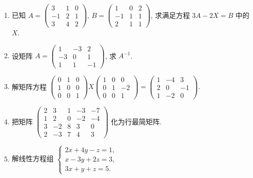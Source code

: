 \begin{enumerate}
	
	
	\item 已知 $A =
	\begin{pmatrix}
		3 & 1 & 0 \\
		-1 & 2 & 1 \\
		3 & 4 & 2
	\end{pmatrix}$, $B =
	\begin{pmatrix}
		1 & 0 & 2 \\
		-1 & 1 & 1 \\
		2 & 1 & 1
	\end{pmatrix}$, 求满足方程 $3A - 2X = B$ 中的 $X$.
	
	
	
	\item 设矩阵 $A =
	\begin{pmatrix}
		1 & -3 & 2 \\
		-3 & 0 & 1 \\
		1 & 1 & -1
	\end{pmatrix}$, 求 $A^{-1}$.
	
	
	\item 解矩阵方程
	$
	\begin{pmatrix}
		0 & 1 & 0 \\
		1 & 0 & 0 \\
		0 & 0 & 1
	\end{pmatrix}
	X
	\begin{pmatrix}
		1 & 0 & 0 \\
		0 & 1 & -2 \\
		0 & 0 & 1
	\end{pmatrix}
	=
	\begin{pmatrix}
		1 & -4 & 3 \\
		2 & 0 & -1 \\
		1 & -2 & 0
	\end{pmatrix}.
	$
	
	
	\item 把矩阵
	$
	\begin{pmatrix}
		2 & 3 & 1 & -3 & -7 \\
		1 & 2 & 0 & -2 & -4 \\
		3 & -2 & 8 & 3 & 0 \\
		2 & -3 & 7 & 4 & 3
	\end{pmatrix}
	$
	化为行最简矩阵.
	
	
	
	\item 解线性方程组
	$
	\begin{cases}
		2x + 4y - z = 1, \\
		x - 3y + 2z = 3, \\
		3x + y + z = 5.
	\end{cases}
	$
	

\end{enumerate}
